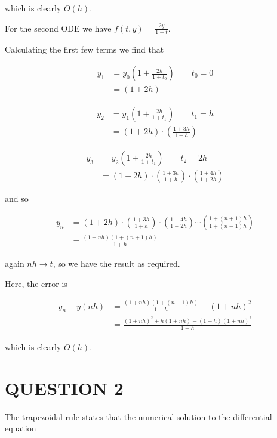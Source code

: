 \documentclass[a4paper]{article}
\begin{document}
which is clearly $ O(h) $.




For the second ODE we have $ f(t,y) = \frac{2y}{1+t} $.

Calculating the first few terms we find that

\begin{align*}
y_{1} & = y_{0} \left(  1 + \frac{2h}{1+t_{0}} \right) \qquad t_{0} = 0 \\
& = (1+2h)
\end{align*}

\begin{align*}
y_{2} & = y_{1} \left(  1 + \frac{2h}{1+t_{1}} \right) \qquad t_{1} = h \\
& = (1+2h) \cdot \left(  \frac{1+3h}{1+h}  \right) 
\end{align*}


\begin{align*}
y_{3} & = y_{2} \left(  1 + \frac{2h}{1+t_{1}} \right) \qquad t_{2} = 2h \\
& = (1+2h) \cdot \left(  \frac{1+3h}{1+h}  \right) \cdot \left(  \frac{1+4h}{1+2h} \right) 
\end{align*}

and so

\begin{align*}
y_{n} & = (1+2h) \cdot \left(  \frac{1+3h}{1+h}  \right) \cdot \left(  \frac{1+4h}{1+2h} \right) \cdots \left(  \frac{1 + (n+1)h}{1 + (n-1)h} \right)  \\
& = \frac{(1+nh)(1+(n+1)h)}{1+h} 
\end{align*}

again $ nh \to t $, so we have the result as required. 

Here, the error is 


\begin{align*}
y_{n} - y(nh) & = \frac{(1+nh)(1+(n+1)h)}{1+h} - (1 + nh)^{2} \\
& =  \frac{(1+nh)^{2} + h(1 + nh) -(1+h)(1 + nh)^{2}  }{1+h} 
\end{align*}

which is clearly $ O(h) $. 








\section{QUESTION 2}

The trapezoidal rule states that the numerical solution to the differential equation
\end{document}
